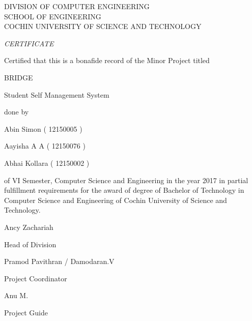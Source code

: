 \documentclass{article}
\begin{document}
\begin{center}

\LARGE
DIVISION OF COMPUTER ENGINEERING\\
SCHOOL OF ENGINEERING\\
COCHIN UNIVERSITY OF SCIENCE AND TECHNOLOGY\\

\hspace{1em}

\huge
\emph{CERTIFICATE}

\hspace{1em}

\large
Certified that this is a bonafide record of the Minor Project titled

\hspace{1em}

\LARGE
BRIDGE

\large
Student Self Management System

\hspace{1em}

done by

\hspace{1em}

\Large
Abin Simon ( 12150005 )

\Large
Aayisha A A ( 12150076 )

\Large
Abhai Kollara ( 12150002 )

\hspace{1em}

\large
of VI Semester, Computer Science and Engineering in the year 2017 in partial fulfillment requirements for the award of degree of Bachelor of Technology in Computer Science and Engineering of Cochin University of Science and Technology.

\hspace{1em}
\vspace{5em}

\begin{minipage}[b]{0.33333\textwidth}
\raggedright
Ancy Zachariah

Head of Division\\
\end{minipage}%
\begin{minipage}[b]{0.33333\textwidth}
\centering
Pramod Pavithran / Damodaran.V

Project Coordinator\\
\end{minipage}%
\begin{minipage}[b]{0.33333\textwidth}
\raggedleft
Anu M.

Project Guide\\
\end{minipage}



\end{center}
\end{document}
